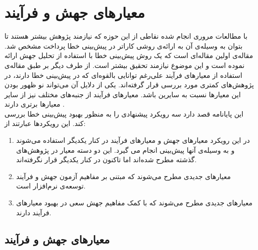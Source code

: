 \chapter{معیارهای جهش و فرآیند}
 
\label{chap:method}
با  مطالعات مروری انجام شده نقاطی از این حوزه که نیازمند پژوهش بیشتر هستند تا بتوان به وسیله‌ی آن به ارائه‌ی روشی کاراتر در پیش‌بینی خطا پرداخت مشخص شد. مقاله‌ی \cite{bowes2016mutation} اولین مقاله‌ای است که  یک  روش پیش‌بینی خطا با استفاده از تحلیل جهش ارائه نموده  است و این موضوع نیازمند تحقیق بیشتر است. از طرف دیگر بر طبق مقاله‌ی \cite{radjenovic2013software} استفاده از معیارهای فرآیند علی‌رغم توانایی بالقوه‌ای که در پیش‌بینی خطا دارند، در پژوهش‌های کمتری مورد بررسی قرار گرفته‌اند. یکی از دلایل آن می‌تواند نو ظهور بودن این معیارها نسبت به سایرین باشد. معیارهای فرآیند از جنبه‌های مختلف نیز از سایر معیار‌ها برتری دارند \cite{rahman2013and}. \\
این پایانامه قصد دارد سه رویکرد  پیشنهادی را به منظور بهبود پیش‌بینی خطا بررسی کند.  این رویکردها عبارتند از:
\begin{enumerate}
\item
در این رویکرد معیارهای جهش و معیارهای فرآیند در کنار یکدیگر استفاده می‌شوند و به وسیله‌ی آنها پیش‌بینی انجام می گیرد. این دو دسته معیار در پژوهش‌های گذشته مطرح شده‌اند اما تاکنون در کنار یکدیگر قرار نگرفته‌اند.
\item
معیارهای جدیدی مطرح می‌شوند که مبتنی بر مفاهیم آزمون جهش و فرآیند توسعه‌ی نرم‌افزار است.
\item
معیارهای جدیدی مطرح می‌شوند که با کمک مفاهیم جهش سعی در بهبود معیارهای فرآیند دارند.
\end{enumerate}

\section{معیارهای جهش و فرآیند}
\label{sec:method-phase1}

